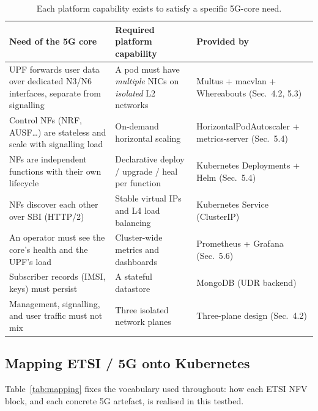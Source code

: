 \begin{table}[H]
\centering
\small
\begin{tabular}{p{} p{} p{}}
\toprule
\textbf{Need of the 5G core} & \textbf{Required platform capability} & \textbf{Provided by} \\
\midrule
UPF forwards user data over dedicated N3/N6 interfaces, separate from signalling
  & A pod must have \emph{multiple} NICs on \emph{isolated} L2 networks
  & Multus + macvlan + Whereabouts (Sec.~4.2, 5.3) \\
Control NFs (NRF, AUSF\ldots) are stateless and scale with signalling load
  & On-demand horizontal scaling
  & HorizontalPodAutoscaler + metrics-server (Sec.~5.4) \\
NFs are independent functions with their own lifecycle
  & Declarative deploy / upgrade / heal per function
  & Kubernetes Deployments + Helm (Sec.~5.4) \\
NFs discover each other over SBI (HTTP/2)
  & Stable virtual IPs and L4 load balancing
  & Kubernetes Service (ClusterIP) \\
An operator must see the core's health and the UPF's load
  & Cluster-wide metrics and dashboards
  & Prometheus + Grafana (Sec.~5.6) \\
Subscriber records (IMSI, keys) must persist
  & A stateful datastore
  & MongoDB (UDR backend) \\
Management, signalling, and user traffic must not mix
  & Three isolated network planes
  & Three-plane design (Sec.~4.2) \\
\bottomrule
\end{tabular}
\caption{Each platform capability exists to satisfy a specific 5G-core need.}
\label{tab:requirements}
\end{table}

\subsection{Mapping ETSI / 5G onto Kubernetes}

Table~\ref{tab:mapping} fixes the vocabulary used throughout: how each ETSI NFV
block, and each concrete 5G artefact, is realised in this testbed.

